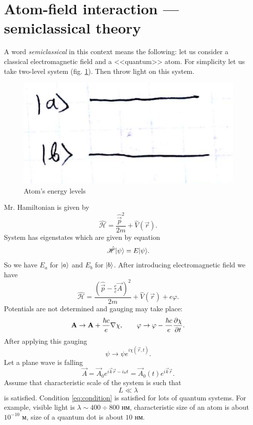 \section{Atom-field interaction --- semiclassical theory}

A word \textit{semiclassical} in this context means the following: let us consider a classical electromagnetic field and a <<quantum>> atom. For simplicity let us take two-level system (fig. \ref{fig:2lvl}). Then throw light on this system.
\begin{figure}[h!]
	\centering
	\includegraphics[width=0.4\linewidth]{fig/L4/2lvl}
	\caption{Atom's energy levels }
	\label{fig:2lvl}
\end{figure}

Mr. Hamiltonian is given by
\begin{equation}
	\hat{\mathscr{H}} = \frac{\hat{\vec{p}}^2}{2 m} + \hat{V} (\vec{r}).
\end{equation}
System has eigenstates which are given by equation
\begin{equation}
	\hat{\mathscr{H}} \lvert\psi\rangle = E \lvert\psi\rangle.
\end{equation}
So we have $E_a$ for $\lvert a\rangle$ and $E_b$ for $\lvert b\rangle$. After introducing electromagnetic field we have
\begin{equation}
	\hat{\mathscr{H}} = \frac{(\hat{\vec{p}} - \frac{e}{c} \vec{A})^2}{2m} + \hat{V}(\vec{r}) + e \varphi.
\end{equation}
Potentials are not determined and gauging may take place:
\begin{equation}
	\mathbf{A} \to \mathbf{A} + \frac{\hbar c}{e} \nabla \chi, \qquad \varphi \to \varphi - \frac{\hbar c}{e} \dfrac{\partial {\chi}}{\partial {t}}.
\end{equation}
After applying this gauging 
\begin{equation}
	\psi \to \psi e^{i \chi(\vec{r},t)}.
\end{equation}
Let a plane wave is falling 
\begin{equation}
	\vec{A} = \vec{A}_0 e^{i \vec{k}\vec{r} - i \omega t} = \vec{A}_0(t) e^{i \vec{k}\vec{r}}.
\end{equation}
Assume that characteristic scale of the system is such that 
\begin{equation}
	L \ll \lambda
	\label{eq:condition}
\end{equation}
is satisfied. Condition \eqref{eq:condition} is satisfied for lots of quantum systems. 
For example, visible light is $\lambda \sim 400 \div 800 \text{ нм}$, 
characteristic size of an atom is about $10^{-10} \text{ м}$, size of a quantum dot is about $10 \text{ нм}$. 

